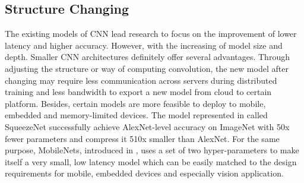 \documentclass[a4paper]{article}
\begin{document}
\subsection{Structure Changing}
\par The existing models of CNN lead research to focus on the improvement of lower latency and higher accuracy. However, with the increasing of model size and depth. Smaller CNN architectures definitely offer several advantages. Through adjusting the structure or way of computing convolution, the new model after changing may require less communication across servers during distributed training and less bandwidth to export a new model from cloud to certain platform. Besides, certain models are more feasible to deploy to mobile, embedded and memory-limited devices. The model represented in \cite{squeezenet} called SqueezeNet successfully achieve AlexNet-level accuracy on ImageNet with 50x fewer parameters and compress it 510x smaller than AlexNet. For the same purpose, MobileNets, introduced in \cite{mobilenets}, uses a set of two hyper-parameters to make itself a very small, low latency model which can be easily matched to the design requirements for mobile, embedded devices and especially vision application.
\end{document}
